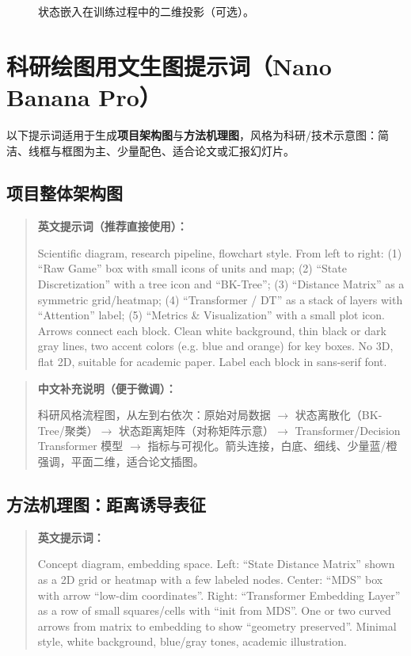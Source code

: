 \documentclass[UTF8,11pt]{ctexart}
\begin{document}
\begin{figure}[H]
    \centering
    \caption{状态嵌入在训练过程中的二维投影（可选）。}
    \label{fig:embed}
\end{figure}

\vspace{0.5em}

\appendix
\section{科研绘图用文生图提示词（Nano Banana Pro）}
\label{sec:prompts}

以下提示词适用于生成\textbf{项目架构图}与\textbf{方法机理图}，风格为科研/技术示意图：简洁、线框与框图为主、少量配色、适合论文或汇报幻灯片。

\subsection{项目整体架构图}
\begin{quote}
\textbf{英文提示词（推荐直接使用）：}

Scientific diagram, research pipeline, flowchart style. From left to right: (1) ``Raw Game'' box with small icons of units and map; (2) ``State Discretization'' with a tree icon and ``BK-Tree''; (3) ``Distance Matrix'' as a symmetric grid/heatmap; (4) ``Transformer / DT'' as a stack of layers with ``Attention'' label; (5) ``Metrics \& Visualization'' with a small plot icon. Arrows connect each block. Clean white background, thin black or dark gray lines, two accent colors (e.g. blue and orange) for key boxes. No 3D, flat 2D, suitable for academic paper. Label each block in sans-serif font.
\end{quote}

\begin{quote}
\textbf{中文补充说明（便于微调）：}

科研风格流程图，从左到右依次：原始对局数据 $\to$ 状态离散化（BK-Tree/聚类）$\to$ 状态距离矩阵（对称矩阵示意）$\to$ Transformer/Decision Transformer 模型 $\to$ 指标与可视化。箭头连接，白底、细线、少量蓝/橙强调，平面二维，适合论文插图。
\end{quote}

\subsection{方法机理图：距离诱导表征}
\begin{quote}
\textbf{英文提示词：}

Concept diagram, embedding space. Left: ``State Distance Matrix'' shown as a 2D grid or heatmap with a few labeled nodes. Center: ``MDS'' box with arrow ``low-dim coordinates''. Right: ``Transformer Embedding Layer'' as a row of small squares/cells with ``init from MDS''. One or two curved arrows from matrix to embedding to show ``geometry preserved''. Minimal style, white background, blue/gray tones, academic illustration.
\end{quote}
\end{document}
